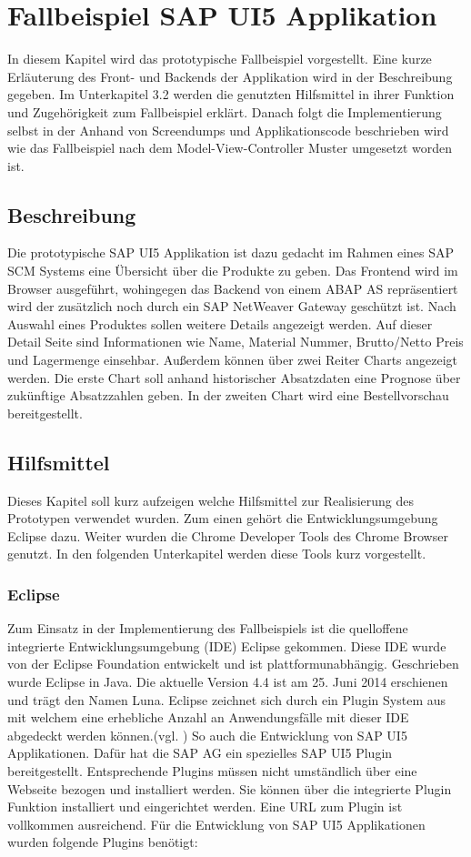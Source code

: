 \section{Fallbeispiel SAP UI5 Applikation}\label{fallbeispiel}
In diesem Kapitel wird das prototypische Fallbeispiel vorgestellt. Eine kurze Erläuterung des Front- und Backends der Applikation wird in der Beschreibung gegeben. Im Unterkapitel 3.2 werden die genutzten Hilfsmittel in ihrer Funktion und Zugehörigkeit zum Fallbeispiel erklärt. Danach folgt die Implementierung selbst in der Anhand von Screendumps und Applikationscode beschrieben wird wie das Fallbeispiel nach dem Model-View-Controller Muster umgesetzt worden ist.

\subsection{Beschreibung}
Die prototypische SAP UI5 Applikation ist dazu gedacht im Rahmen eines SAP SCM Systems eine Übersicht über die Produkte zu geben. Das Frontend wird im Browser ausgeführt, wohingegen das Backend von einem ABAP AS repräsentiert wird der zusätzlich noch durch ein SAP NetWeaver Gateway geschützt ist. Nach Auswahl eines Produktes sollen weitere Details angezeigt werden. Auf dieser Detail Seite sind Informationen wie Name, Material Nummer, Brutto/Netto Preis und Lagermenge einsehbar. Außerdem können über zwei Reiter Charts angezeigt werden. Die erste Chart soll anhand historischer Absatzdaten eine Prognose über zukünftige Absatzzahlen geben. In der zweiten Chart wird eine Bestellvorschau bereitgestellt.

\subsection{Hilfsmittel}
Dieses Kapitel soll kurz aufzeigen welche Hilfsmittel zur Realisierung des Prototypen verwendet wurden. Zum einen gehört die Entwicklungsumgebung Eclipse dazu. Weiter wurden die Chrome Developer Tools des Chrome Browser genutzt. In den folgenden Unterkapitel werden diese Tools kurz vorgestellt.

\subsubsection{Eclipse}
Zum Einsatz in der Implementierung des Fallbeispiels ist die quelloffene integrierte Entwicklungsumgebung (IDE) Eclipse gekommen. Diese IDE wurde von der Eclipse Foundation entwickelt und ist plattformunabhängig. Geschrieben wurde Eclipse in Java. Die aktuelle Version 4.4 ist am 25. Juni 2014 erschienen und trägt den Namen Luna. Eclipse zeichnet sich durch ein Plugin System aus mit welchem eine erhebliche Anzahl an Anwendungsfälle mit dieser IDE abgedeckt werden können.(vgl. \cite{WikiEclipse2014}) So auch die Entwicklung von SAP UI5 Applikationen. Dafür hat die SAP AG ein spezielles SAP UI5 Plugin bereitgestellt. Entsprechende Plugins müssen nicht umständlich über eine Webseite bezogen und installiert werden. Sie können über die integrierte Plugin Funktion installiert und eingerichtet werden. Eine URL zum Plugin ist vollkommen ausreichend. Für die Entwicklung von SAP UI5 Applikationen wurden folgende Plugins benötigt:
	
